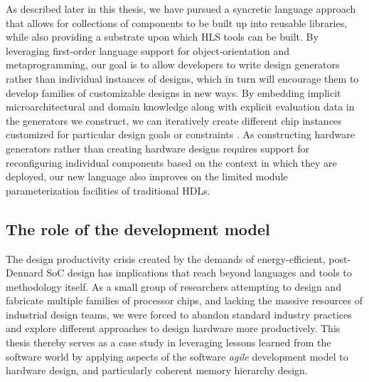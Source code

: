 As described later in this thesis, we have pursued a syncretic language approach that allows for collections of components to be built up into reusable libraries, while also providing a substrate upon which HLS tools can be built.
By leveraging first-order language support for object-orientation and metaprogramming, 
our goal is to allow developers to write design generators rather than individual instances of designs,
which in turn will encourage them to develop families of customizable designs in new ways.
By embedding implicit microarchitectural and domain knowledge along with explicit evaluation data in the generators we construct, we can iteratively create different chip instances customized for particular design goals or constraints \cite{shacham-micro10}.
As constructing hardware generators rather than creating hardware designs requires
support for reconfiguring individual components based on the context in which they are deployed,
our new language also improves on the limited module parameterization facilities of traditional HDLs.

\subsection{The role of the development model}

The design productivity crisis created by the demands of energy-efficient, post-Dennard SoC design has implications that reach beyond
languages and tools to methodology itself.
As a small group of researchers attempting to design and fabricate multiple families of processor chips,
and lacking the massive resources of industrial design teams,
we were forced to abandon standard industry practices and explore different
approaches to design hardware more productively.
This thesis thereby serves as a case study in leveraging lessons learned from the software world by
applying aspects of the software {\em agile} development model to hardware design,
and particularly coherent memory hierarchy design.

